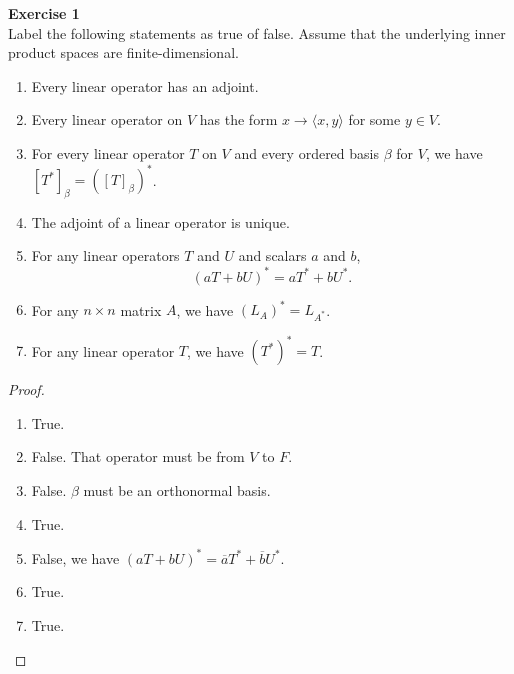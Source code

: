 \documentclass[12pt, a4paper]{article}
\theoremstyle{plain}
\newenvironment{exercise}[2][Exercise]
    { \begin{mdframed}[backgroundcolor=gray!20] \textbf{#1 #2} \\}
    {  \end{mdframed}}
\begin{document}
\begin{exercise}{1}
Label the following statements as true of false. Assume that the underlying inner product spaces are finite-dimensional.
	\begin{enumerate}[label=(\alph*)]
	\item Every linear operator has an adjoint.
	\item Every linear operator on $V$ has the form $x\rightarrow \langle{x,y}\rangle$ for some $y\in V$.
	\item For every linear operator $T$ on $V$ and every ordered basis $\beta$ for $V$, we have $[T^*]_\beta = ([T]_\beta)^*$.
	\item The adjoint of a linear operator is unique.
	\item For any linear operators $T$ and $U$ and scalars $a$ and $b$,
	\[
	(aT+bU)^* = aT^*+bU^*.
	\]
	\item For any $n\times n$ matrix $A$, we have $(L_A)^*=L_{A^*}$.
	\item For any linear operator $T$, we have $(T^*)^*  = T$.
	\end{enumerate}
\end{exercise}
	\begin{proof}
	\hfill
	\begin{enumerate}[label=(\alph*)]
	\item True.
	\item False. That operator must be from $V$ to $F$.
	\item False. $\beta$ must be an orthonormal basis.
	\item True.
	\item False, we have $(aT+bU)^*=\overline{a}T^*+\overline{b}U^*$.
	\item True.
	\item True.
	\end{enumerate}
 	\end{proof}		
 	
\pagebreak
\end{document}
